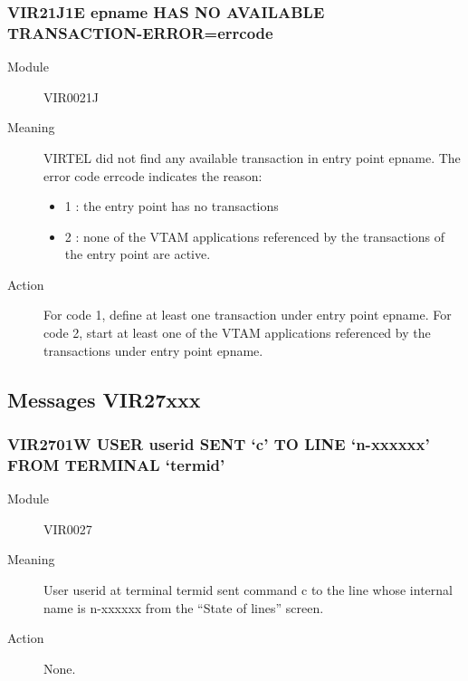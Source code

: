 \documentclass[letterpaper,10pt,english]{sphinxmanual}
\begin{document}
\subsubsection{VIR21J1E epname HAS NO AVAILABLE TRANSACTION-ERROR=errcode}
\label{\detokenize{messages:vir21j1e-epname-has-no-available-transaction-error-errcode}}\begin{description}
\item[{Module}] \leavevmode
VIR0021J

\item[{Meaning}] \leavevmode
VIRTEL did not find any available transaction in entry point epname. The error code errcode indicates the reason:
\begin{itemize}
\item {} 
1 : the entry point has no transactions

\item {} 
2 : none of the VTAM applications referenced by the transactions of the entry point are active.

\end{itemize}

\item[{Action}] \leavevmode
For code 1, define at least one transaction under entry point epname. For code 2, start at least one of the VTAM applications referenced by the transactions under entry point epname.

\end{description}


\subsection{Messages VIR27xxx}
\label{\detokenize{messages:messages-vir27xxx}}

\subsubsection{VIR2701W USER userid SENT ‘c’ TO LINE ‘n-xxxxxx’ FROM TERMINAL ‘termid’}
\label{\detokenize{messages:vir2701w-user-userid-sent-c-to-line-n-xxxxxx-from-terminal-termid}}\begin{description}
\item[{Module}] \leavevmode
VIR0027

\item[{Meaning}] \leavevmode
User userid at terminal termid sent command c to the line whose internal name is n-xxxxxx from the “State of lines” screen.

\item[{Action}] \leavevmode
None.

\end{description}
\end{document}
